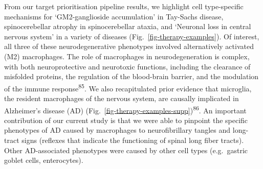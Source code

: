 \documentclass[
]{article}
\begin{document}
From our target prioritisation pipeline results, we highlight cell
type-specific mechanisms for `GM2-ganglioside accumulation' in Tay-Sachs
disease, spinocerebellar atrophy in spinocerebellar ataxia, and
`Neuronal loss in central nervous system' in a variety of diseases
(Fig.~\ref{fig-therapy-examples}). Of interest, all three of these
neurodegenerative phenotypes involved alternatively activated (M2)
macrophages. The role of macrophages in neurodegeneration is complex,
with both neuroprotective and neurotoxic functions, including the
clearance of misfolded proteins, the regulation of the blood-brain
barrier, and the modulation of the immune response\textsuperscript{85}.
We also recapitulated prior evidence that microglia, the resident
macrophages of the nervous system, are causally implicated in
Alzheimer's disease (AD)
(Fig.~\ref{fig-therapy-examples-supp})\textsuperscript{86}. An important
contribution of our current study is that we were able to pinpoint the
specific phenotypes of AD caused by macrophages to neurofibrillary
tangles and long-tract signs (reflexes that indicate the functioning of
spinal long fiber tracts). Other AD-associated phenotypes were caused by
other cell types (e.g.~gastric goblet cells, enterocytes).
\end{document}
